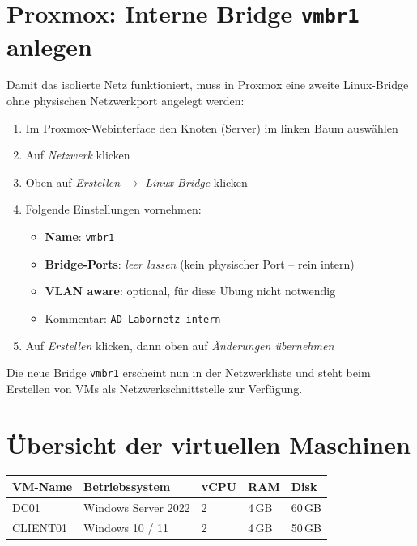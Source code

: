 \documentclass[11pt, oneside, numbers=noenddot]{scrbook}
\begin{document}
\section{Proxmox: Interne Bridge \texttt{vmbr1} anlegen}
Damit das isolierte Netz funktioniert, muss in Proxmox eine zweite Linux-Bridge ohne physischen Netzwerkport angelegt werden:

\begin{enumerate}
  \item Im Proxmox-Webinterface den Knoten (Server) im linken Baum auswählen
  \item Auf \textit{Netzwerk} klicken
  \item Oben auf \textit{Erstellen} $\rightarrow$ \textit{Linux Bridge} klicken
  \item Folgende Einstellungen vornehmen:
  \begin{itemize}
    \item \textbf{Name}: \texttt{vmbr1}
    \item \textbf{Bridge-Ports}: \textit{leer lassen} (kein physischer Port -- rein intern)
    \item \textbf{VLAN aware}: optional, für diese Übung nicht notwendig
    \item Kommentar: \texttt{AD-Labornetz intern}
  \end{itemize}
  \item Auf \textit{Erstellen} klicken, dann oben auf \textit{Änderungen übernehmen}
\end{enumerate}

Die neue Bridge \texttt{vmbr1} erscheint nun in der Netzwerkliste und steht beim Erstellen von VMs als Netzwerkschnittstelle zur Verfügung.

\section{Übersicht der virtuellen Maschinen}

\begin{center}
\begin{tabular}{|l|l|l|l|l|}
\hline
\textbf{VM-Name} & \textbf{Betriebssystem} & \textbf{vCPU} & \textbf{RAM} & \textbf{Disk} \\
\hline
DC01 & Windows Server 2022 & 2 & 4\,GB & 60\,GB \\
CLIENT01 & Windows 10 / 11 & 2 & 4\,GB & 50\,GB \\
\hline
\end{tabular}
\end{center}
\end{document}
